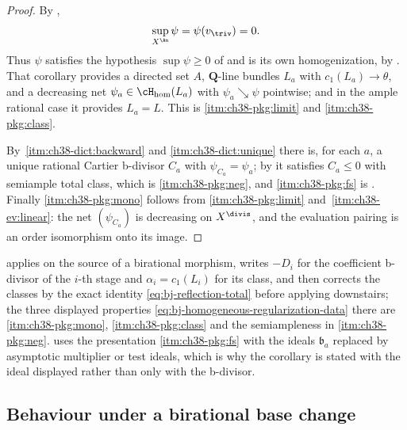 \begin{proof}
By ,
\[
 \sup_{X^{\An}}\psi=\psi(v_{\triv})=0.
\]
Thus $\psi$ satisfies the hypothesis $\sup\psi\geq0$ of
 and is its own homogenization, by
.  That corollary provides a directed
set $A$, $\mathbf Q$-line bundles $L_a$ with
$c_1(L_a)\to\theta$, and a decreasing net
$\psi_a\in\cH_{\mathrm{hom}}(L_a)$ with $\psi_a\searrow\psi$
pointwise; and in the ample rational case it provides $L_a=L$.  This is
\cref{itm:ch38-pkg:limit} and \cref{itm:ch38-pkg:class}.

By \,\cref{itm:ch38-dict:backward} and
\cref{itm:ch38-dict:unique} there is, for each $a$, a unique rational
Cartier b-divisor $C_a$ with $\psi_{C_a}=\psi_a$; by
 it satisfies $C_a\leq0$ with
semiample total class, which is \cref{itm:ch38-pkg:neg}, and
\cref{itm:ch38-pkg:fs} is
.  Finally
\cref{itm:ch38-pkg:mono} follows from
\cref{itm:ch38-pkg:limit} and
\,\cref{itm:ch38-ev:linear}: the net
$(\psi_{C_a})$ is decreasing on $X^{\divis}$, and the evaluation
pairing is an order isomorphism onto its image.
\end{proof}

\begin{remark}
\label{rem:ch38-package-use}
 applies
 on the source of a birational
morphism, writes $-D_i$ for the coefficient b-divisor of the $i$-th
stage and $\alpha_i=c_1(L_i)$ for its class, and then corrects the
classes by the exact identity \eqref{eq:bj-reflection-total} before
applying  downstairs; the three
displayed properties \eqref{eq:bj-homogeneous-regularization-data} there
are \cref{itm:ch38-pkg:mono}, \cref{itm:ch38-pkg:class} and the
semiampleness in \cref{itm:ch38-pkg:neg}.
 uses the presentation
\cref{itm:ch38-pkg:fs} with the ideals $\mathfrak b_a$ replaced by
asymptotic multiplier or test ideals, which is why the corollary is stated
with the ideal displayed rather than only with the b-divisor.
\end{remark}

\subsection{Behaviour under a birational base change}
\label{sec:ch38-base-change}

